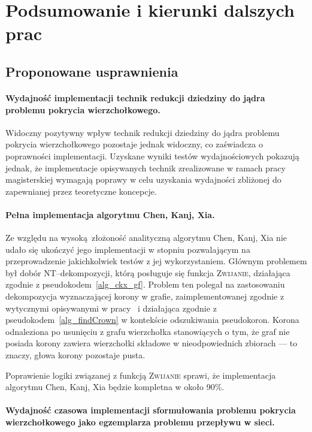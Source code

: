 \chapter{Podsumowanie i kierunki dalszych prac}
\label{summary}
\section{Proponowane usprawnienia}
  \subsubsection{\textbf{Wydajność implementacji technik redukcji dziedziny do jądra problemu pokrycia wierzchołkowego.}}

  Widoczny pozytywny wpływ technik redukcji dziedziny do jądra problemu pokrycia wierzchołkowego pozostaje jednak widoczny, co zaświadcza o poprawności implementacji.
  Uzyskane wyniki testów wydajnościowych pokazują jednak, że implementacje opisywanych technik zrealizowane w ramach pracy magisterskiej wymagają poprawy w celu uzyskania wydajności zbliżonej do zapewnianej przez teoretyczne koncepcje.
  \subsubsection{\textbf{Pełna implementacja algorytmu Chen, Kanj, Xia.}}

  Ze względu na wysoką złożoność analityczną algorytmu Chen, Kanj, Xia nie udało się ukończyć jego implementacji w stopniu pozwalającym na przeprowadzenie jakichkolwiek testów z jej wykorzystaniem.
  Głównym problemem był dobór NT--dekompozycji, którą posługuje się funkcja \textsc{Zwijanie}, działająca zgodnie z pseudokodem~\ref{alg_ckx_gf}.
  Problem ten polegał na zastosowaniu dekompozycja wyznaczającej korony w grafie, zaimplementowanej zgodnie z wytycznymi opisywanymi w pracy~\cite{KernelizationAlgorithms04} i działająca zgodnie z pseudokodem~\ref{alg_findCrown} w kontekście odszukiwania pseudokoron.
  Korona odnaleziona po usunięciu z grafu wierzchołka stanowiących o tym, że graf nie posiada korony zawiera wierzchołki składowe w nieodpowiednich zbiorach --- to znaczy, głowa korony pozostaje pusta.

  Poprawienie logiki związanej z funkcją \textsc{Zwijanie} sprawi, że implementacja algorytmu Chen, Kanj, Xia będzie kompletna w około 90\%.
  \subsubsection{\textbf{Wydajność czasowa implementacji sformułowania problemu pokrycia wierzchołkowego jako egzemplarza problemu przepływu w sieci.}}

